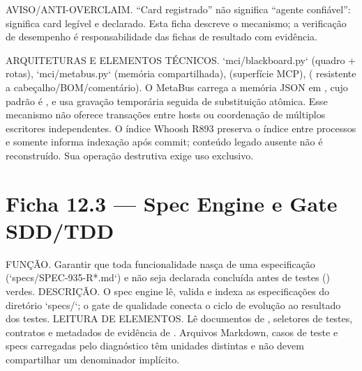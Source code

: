 \begin{aviso}
AVISO/ANTI-OVERCLAIM. ``Card registrado'' não significa ``agente confiável'':
significa card legível e declarado. Esta ficha descreve o mecanismo; a
verificação de desempenho é responsabilidade das fichas de resultado com
evidência.
\end{aviso}

\begin{arquitetura}
ARQUITETURAS E ELEMENTOS TÉCNICOS. `mci/blackboard.py` (quadro + rotas),
`mci/metabus.py` (memória compartilhada),  (superfície MCP),
 ( resistente a
cabeçalho/BOM/comentário). O MetaBus carrega a memória JSON em
, cujo padrão é , e usa gravação
temporária seguida de substituição atômica. Esse mecanismo não oferece
transações entre hosts ou coordenação de múltiplos escritores independentes.
O índice Whoosh R893 preserva o índice entre processos e somente informa
indexação após commit; conteúdo legado ausente não é reconstruído. Sua
operação destrutiva  exige uso exclusivo.
\end{arquitetura}

\section{Ficha 12.3 — Spec Engine e Gate SDD/TDD}


\begin{descricao}
FUNÇÃO. Garantir que toda funcionalidade nasça de uma especificação
(`specs/SPEC-935-R*.md`) e não seja declarada concluída antes de testes
() verdes. DESCRIÇÃO. O spec engine lê, valida e indexa as
especificações do diretório `specs/`; o gate de qualidade conecta o ciclo de
evolução ao resultado dos testes. LEITURA DE ELEMENTOS. Lê documentos de
, seletores de testes, contratos e metadados de evidência de
. Arquivos Markdown, casos de teste e specs
carregadas pelo diagnóstico têm unidades distintas e não devem compartilhar
um denominador implícito.
\end{descricao}

